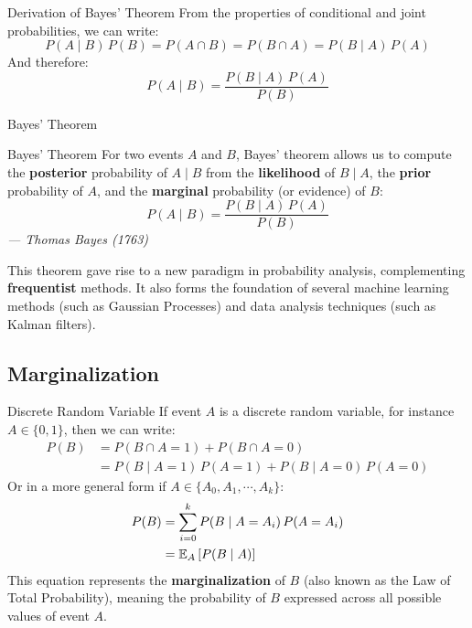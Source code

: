 \begin{frame}{Derivation of Bayes' Theorem}
	From the properties of conditional and joint probabilities, we can write:
	\begin{equation}
		P(A \mid B) \, P(B) = P(A \cap B) = P(B \cap A) = P(B \mid A) \, P(A)
		\nonumber
	\end{equation}
	And therefore:
	\begin{equation}
		P(A \mid B) = \frac{P(B \mid A) \, P(A)}{P(B)}
		\nonumber
	\end{equation}
\end{frame}

\begin{frame}{Bayes' Theorem}
	\begin{block}{Bayes' Theorem}
		For two events $A$ and $B$, Bayes' theorem allows us to compute the \textbf{posterior} probability of $A \mid B$ from the \textbf{likelihood} of $B \mid A$, the \textbf{prior} probability of $A$, and the \textbf{marginal} probability (or evidence) of $B$:
		\begin{equation}
			P(A \mid B) = \displaystyle \frac{P(B \mid A) \, P(A)}{P(B)}
			\nonumber
		\end{equation}
		\hfill
		\textit{--- Thomas Bayes (1763)}
	\end{block}
	\pause
	This theorem gave rise to a new paradigm in probability analysis, complementing \textbf{frequentist} methods. It also forms the foundation of several machine learning methods (such as Gaussian Processes) and data analysis techniques (such as Kalman filters). 
\end{frame}

\subsection{Marginalization}

\begin{frame}{Discrete Random Variable}
	If event $A$ is a discrete random variable, for instance $A \in \{0, 1\}$, then we can write:
	\begin{equation}
		\begin{aligned}
			P(B) &= P(B \cap A=1) + P(B \cap A=0) \\
			&= P(B \mid A=1) \, P(A=1) + P(B \mid A=0) \, P(A=0)
		\end{aligned}
		\nonumber 
	\end{equation}
	\pause
	Or in a more general form if $A \in \{A_0, A_1, \cdots, A_k\}$:
	\begin{equation}
		\begin{aligned}
			P(B) &= \sum_{i=0}^k P(B \mid A=A_i) \, P(A=A_i) \\
			&= \E[A]{P(B \mid A)}
		\end{aligned}
		\nonumber
	\end{equation}
	\pause
	This equation represents the \textbf{marginalization} of $B$ (also known as the Law of Total Probability), meaning the probability of $B$ expressed across all possible values of event $A$.
\end{frame}

